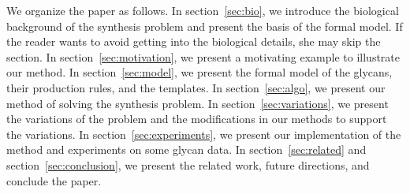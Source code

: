 We organize the paper as follows.
In section~\ref{sec:bio}, we introduce the biological background of the synthesis problem and present the basis of the formal model.
If the reader wants to avoid getting into the biological details, she may skip the section.
In section~\ref{sec:motivation}, we present a motivating example to illustrate our method.
In section~\ref{sec:model}, we present the formal model of the glycans, their production
rules, and the templates.
In section~\ref{sec:algo}, we present our method of solving the synthesis problem.
In section~\ref{sec:variations}, we present the variations of the problem and the modifications
in our methods to support the variations.
In section~\ref{sec:experiments}, we present our implementation of the method and experiments on
some glycan data.
In section~\ref{sec:related} and section~\ref{sec:conclusion},
we present the related work, future directions, and conclude the paper.


